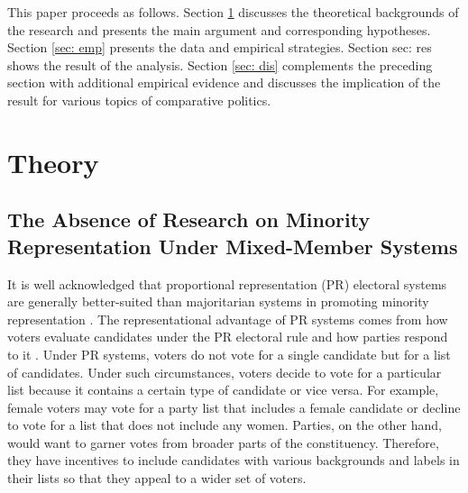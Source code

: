 \documentclass[a4paper, 11pt]{article}
\begin{document}
This paper proceeds as follows. Section \ref{sec: the} discusses the theoretical backgrounds of the research and presents the main argument and corresponding hypotheses. Section \ref{sec: emp} presents the data and empirical strategies. Section {sec: res} shows the result of the analysis. Section \ref{sec: dis} complements the preceding section with additional empirical evidence and discusses the implication of the result for various topics of comparative politics. 

\section{Theory} \label{sec: the}

\subsection{The Absence of Research on Minority Representation Under Mixed-Member Systems}

It is well acknowledged that proportional representation (PR) electoral systems are generally better-suited than majoritarian systems in promoting minority representation \citep{matland_contagion_1996, matland_womens_1998, meserve_gender_2020}. The representational advantage of PR systems comes from how voters evaluate candidates under the PR electoral rule and how parties respond to it \citep{norris_electoral_2004}. Under PR systems, voters do not vote for a single candidate but for a list of candidates. Under such circumstances, voters decide to vote for a particular list because it contains a certain type of candidate or vice versa. For example, female voters may vote for a party list that includes a female candidate or decline to vote for a list that does not include any women. Parties, on the other hand, would want to garner votes from broader parts of the constituency. Therefore, they have incentives to include candidates with various backgrounds and labels in their lists so that they appeal to a wider set of voters. 

\end{document}
